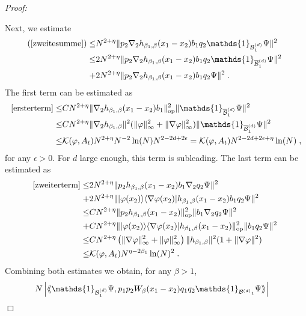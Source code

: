 \documentclass[11pt, english, american]{article}
\newcommand{\laa}{\langle\hspace{-0.08cm}\langle}
\newcommand{\raa}{\rangle\hspace{-0.08cm}\rangle}
\newenvironment{proof}{\emph{Proof:}}{\begin{flushright} $ \Box $ \end{flushright}}
\renewcommand{\phi}{\varphi}
\begin{document}
\begin{proof}
\begin{enumerate}
Next, we estimate 
\begin{align}
(\ref{zweitesumme})\leq& 
N^{2+\eta}\| p_2
\nabla_2 h_{\beta_1,\beta}(x_1-x_2)b_1 q_2
\mathds{1}_{{\mathcal{B}_1^{(d)}}} \Psi\|^2\
\nonumber
\\
\leq&
\label{ersterterm}
2 N^{2+\eta}\| p_2
\nabla_2 h_{\beta_1,\beta}(x_1-x_2)b_1 q_2
\mathds{1}_{\overline{\mathcal{B}}^{(d)}_{1}}\Psi\|^2\
\\
+&
\label{zweiterterm}
2 N^{2+\eta}\| p_2
\nabla_2 h_{\beta_1,\beta}(x_1-x_2)b_1 q_2
\Psi\|^2
\;.
\end{align}
The first term can be estimated as 
\begin{align*}
\eqref{ersterterm} 
\leq &
C N^{2+ \eta} \|\nabla_2 h_{\beta_1,\beta}(x_1-x_2)b_1\|_{\text{op}}^2 
\|\mathds{1}_{\overline{\mathcal{B}}^{(d)}_{1}}\Psi\|^2
\\
\leq &
C N^{2+ \eta} \|\nabla_2 h_{\beta_1,\beta}\|^2 (\| \phi \|^2_\infty+\| \nabla \phi \|^2_\infty)
\|\mathds{1}_{\overline{\mathcal{B}}^{(d)}_{1}}\Psi\|^2
\\
\leq &
\mathcal{K}(\phi, A_t)
N^{2+ \eta} N^{-2} \ln(N) N^{2-2d+ 2 \epsilon}
=
\mathcal{K}(\phi, A_t)
 N^{2-2d+2 \epsilon + \eta} \ln(N)
 \;,
\end{align*}
for any $\epsilon >0$.
For $d$ large enough, this term is subleading.
The last term can be estimated as
\begin{align*}
\eqref{zweiterterm}
\leq&
2N^{2+\eta}\| p_2
 h_{\beta_1,\beta}(x_1-x_2)b_1 \nabla_2q_2
\Psi\|^2
\nonumber
\\+&
2N^{2+\eta}\| |\varphi(x_2)\rangle \langle \nabla \varphi (x_2)|
 h_{\beta_1,\beta}(x_1-x_2)b_1 q_2
\Psi\|^2\
\nonumber
\\
\leq &
C N^{2+\eta}\| p_2
 h_{\beta_1,\beta}(x_1-x_2)
 \|_{\text{op}}^2
 \| b_1\nabla_2q_2
\Psi\|^2\
\nonumber
\\
+&
C N^{2+\eta}
\| |\varphi(x_2)\rangle \langle \nabla \varphi(x_2)|
 h_{\beta_1,\beta}(x_1-x_2) \|_{\text{op}}^2
  \| b_1 q_2
\Psi\|^2\
\nonumber
\\
\leq &
C N^{2+\eta} \left( \|\nabla \varphi \|_\infty^2+ \| \varphi \|_\infty^2 \right)
\| h_{\beta_1,\beta} \|^2 (1+ \| \nabla \phi \|^2)
\nonumber
\\ \leq&
\mathcal{K}(\phi, A_t)
N^{\eta- 2\beta_1} \ln(N)^2
\;.
\end{align*}
Combining both estimates  we obtain, for any $\beta>1$,
\begin{align*}
&N\left|\laa \mathds{1}_{{\mathcal{B}_1^{(d)}}} \Psi, p_1p_2W_{\beta}(x_1-x_2)q_1q_2  \mathds{1}_{{\mathcal{B}^{(d)}}_{1}}\Psi\raa\right|

\end{align*}
\end{enumerate}
\end{proof}
\end{document}
